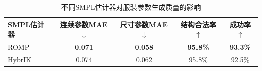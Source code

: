 \begin{table}[t]
    \centering
    \caption{不同SMPL估计器对服装参数生成质量的影响}
    \label{tab:ch4-estimator}
    \setlength{\tabcolsep}{10pt}
    \begin{tabular}{lcccc}
        \toprule
        \textbf{SMPL估计器}
        & \textbf{连续参数MAE}$\downarrow$ & \textbf{尺寸参数MAE}$\downarrow$ & \textbf{结构合法率}$\uparrow$ & \textbf{成功率}$\uparrow$ \\
        \midrule
        ROMP
        & \textbf{0.071} & \textbf{0.058} & \textbf{95.8\%} & \textbf{93.3\%} \\
        HybrIK
        & 0.074 & 0.062 & 95.8\% & 92.5\% \\
        \bottomrule
    \end{tabular}
\end{table}
